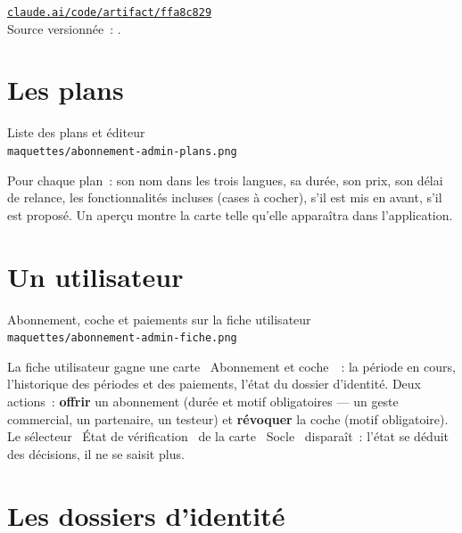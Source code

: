 \begin{note}
\href{https://claude.ai/code/artifact/ffa8c829-4047-4f86-b089-3330fe810687}%
{\texttt{claude.ai/code/artifact/ffa8c829}}\\
Source versionnée~: .
\end{note}

\section{Les plans}

\begin{center}
    {Liste des plans et éditeur\\
     \texttt{maquettes/abonnement-admin-plans.png}}
\end{center}

Pour chaque plan~: son nom dans les trois langues, sa durée, son prix, son délai de relance,
les fonctionnalités incluses (cases à cocher), s'il est mis en avant, s'il est proposé. Un
aperçu montre la carte telle qu'elle apparaîtra dans l'application.

\section{Un utilisateur}

\begin{center}
    {Abonnement, coche et paiements sur la fiche utilisateur\\
     \texttt{maquettes/abonnement-admin-fiche.png}}
\end{center}

La fiche utilisateur gagne une carte \guillemotleft~Abonnement et coche~\guillemotright~:
la période en cours, l'historique des périodes et des paiements, l'état du dossier
d'identité. Deux actions~: \textbf{offrir} un abonnement (durée et motif obligatoires --- un
geste commercial, un partenaire, un testeur) et \textbf{révoquer} la coche (motif
obligatoire). Le sélecteur \guillemotleft~État de vérification~\guillemotright{} de la carte
\guillemotleft~Socle~\guillemotright{} disparaît~: l'état se déduit des décisions, il ne se
saisit plus.

\section{Les dossiers d'identité}

